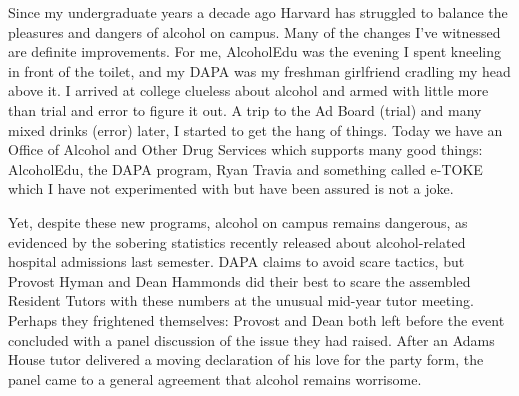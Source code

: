 
Since my undergraduate years a decade ago Harvard has struggled to balance
the pleasures and dangers of alcohol on campus. Many of the changes I've
witnessed are definite improvements. For me, AlcoholEdu was the evening I
spent kneeling in front of the toilet, and my DAPA was my freshman girlfriend
cradling my head above it. I arrived at college clueless about alcohol and
armed with little more than trial and error to figure it out. A trip to the
Ad Board (trial) and many mixed drinks (error) later, I started to get the
hang of things. Today we have an Office of Alcohol and Other Drug Services
which supports many good things: AlcoholEdu, the DAPA program, Ryan Travia
and something called e-TOKE which I have not experimented with but have been
assured is not a joke.

Yet, despite these new programs, alcohol on campus remains dangerous, as
evidenced by the sobering statistics recently released about alcohol-related
hospital admissions last semester. DAPA claims to avoid scare tactics, but
Provost Hyman and Dean Hammonds did their best to scare the assembled
Resident Tutors with these numbers at the unusual mid-year tutor meeting.
Perhaps they frightened themselves: Provost and Dean both left before the
event concluded with a panel discussion of the issue they had raised. After
an Adams House tutor delivered a moving declaration of his love for the party
form, the panel came to a general agreement that alcohol remains worrisome.


